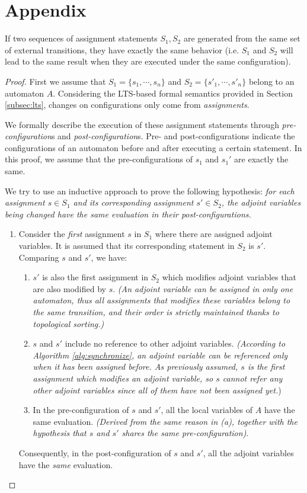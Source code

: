 \section*{Appendix}

\setcounter{theorem}{0}
\begin{theorem} If two sequences of assignment statements $S_1, S_2$ are generated from the same set of external transitions, they have exactly the same behavior (i.e. $S_1$ and $S_2$ will lead to the same result when they are executed under the same configuration).
\end{theorem}
\begin{proof}
    First we assume that $S_1=\{s_1,\cdots,s_n\}$ and $S_2=\{s'_1,\cdots,s'_n\}$ belong to an automaton $A$.
    Considering the LTS-based formal semantics provided in Section \ref{subsec:lts}, changes on configurations only come from \emph{assignments}. 
    
    We formally describe the execution of these assignment statements through \emph{pre-configuration}s and \emph{post-configuration}s. Pre- and post-configurations indicate the configurations of an automaton before and after executing a certain statement. In this proof, we assume that the pre-configurations of $s_1$ and $s_1'$ are exactly the same.
    
    
    We try to use an inductive approach to prove the following hypothesis: \emph{for each assignment $s\in S_1$ and its corresponding assignment $s'\in S_2$, the adjoint variables being changed have the same evaluation in their post-configurations.}
    \begin{enumerate}
        \item Consider the \emph{first} assignment $s$ in $S_1$ where there are assigned adjoint variables. It is assumed that its corresponding statement in $S_2$ is $s'$. Comparing $s$ and $s'$, we have:
        \begin{enumerate}
            \item $s'$ is also the first assignment in $S_2$ which modifies adjoint variables that are also modified by $s$.
            \emph{(An adjoint variable can be assigned in only one automaton, thus all assignments that modifies these variables belong to the same transition, and their order is strictly maintained thanks to topological sorting.)}
            \item $s$ and $s'$ include no reference to other adjoint variables. \emph{(According to Algorithm \ref{alg:synchronize}, an adjoint variable can be referenced only when it has been assigned before. As previously assumed, $s$ is the first assignment which modifies an adjoint variable, so $s$ cannot refer any other adjoint variables since all of them have not been assigned yet.})
            \item In the pre-configuration of $s$ and $s'$, all the local variables of $A$ have the same evaluation. \emph{(Derived from the same reason in (a), together with the hypothesis that $s$ and $s'$ shares the same pre-configuration)}.
        \end{enumerate}
        Consequently, in the post-configuration of $s$ and $s'$, all the adjoint variables have the \emph{same} evaluation.


\end{enumerate}
\end{proof}
